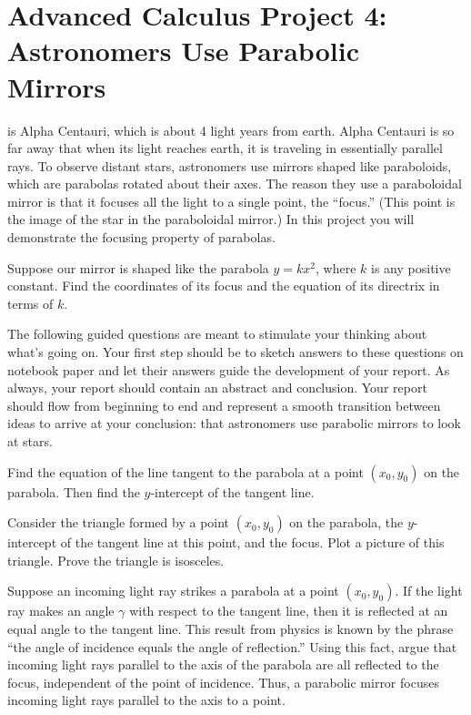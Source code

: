 \documentclass
[justified,nohyper]
{tufte-handout}
\theoremstyle{mydef}
\begin{document}
\section{Advanced Calculus Project 4: Astronomers Use Parabolic Mirrors}
 is Alpha Centauri, which is about 4 light years from earth. Alpha Centauri is so far away that when its light reaches earth, it is traveling in essentially parallel rays. To observe distant stars, astronomers use mirrors shaped like paraboloids, which are parabolas rotated about their axes. The reason they use a paraboloidal mirror is that it focuses all the light to a single point, the ``focus.'' (This point is the image of the star in the paraboloidal mirror.) In this project you will demonstrate the focusing property of parabolas.

Suppose our mirror is shaped like the parabola $y=kx^2$, where $k$ is any positive constant. Find the coordinates of its focus and the equation of its directrix in terms of $k$.

The following guided questions are meant to stimulate your thinking about what's going on. Your first step should be to sketch answers to these questions on notebook paper and let their answers guide the development of your report. As always, your report should contain an abstract and conclusion. Your report should flow from beginning to end and represent a smooth transition between ideas to arrive at your conclusion: that astronomers use parabolic mirrors to look at stars.

Find the equation of the line tangent to the parabola at a point $(x_0,y_0)$ on the parabola. Then find the $y$-intercept of the tangent line.

Consider the triangle formed by a point $(x_0,y_0)$ on the parabola, the $y$-intercept of the tangent line at this point, and the focus. Plot a picture of this triangle. Prove the triangle is isosceles.

Suppose an incoming light ray strikes a parabola at a point $(x_0,y_0)$. If the light ray makes an angle $\gamma$ with respect to the tangent line, then it is reflected at an equal angle to the tangent line. This result from physics is known by the phrase ``the angle of incidence equals the angle of reflection.'' Using this fact, argue that incoming light rays parallel to the axis of the parabola are all reflected to the focus, independent of the point of incidence. Thus, a parabolic mirror focuses incoming light rays parallel to the axis to a point.
\end{document}
